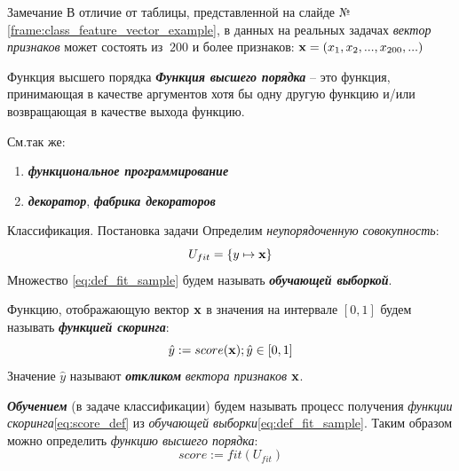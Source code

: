 \documentclass{beamer}
\newcommand{\termdef}[1]{\textbf{\textit{#1}}}
\newcommand{\term}{\textit}
\begin{document}
  \begin{frame}
   \begin{block}{Замечание}
	  В отличие от таблицы, представленной на слайде №\ref{frame:class_feature_vector_example},
	  в данных на реальных задачах \term{вектор признаков} может состоять из $~200$ и более признаков:
	  $\bold x = (x_1, x_2, ..., x_{200}, ...)$
  \end{block}
  \end{frame}
  
  \begin{frame}{Функция высшего порядка}
  \termdef{Функция высшего порядка} -- это функция, принимающая в качестве аргументов хотя бы одну другую функцию и/или возвращающая в качестве выхода функцию.
  
  См.так же:
  \begin{enumerate}
  	\item \termdef{функциональное программирование}
  	\item \termdef{декоратор}, \termdef{фабрика декораторов}
  \end{enumerate}
  
  \end{frame}
  
  \begin{frame}{Классификация. Постановка задачи}\label{frame:classification_def}
  	Определим \term{неупорядоченную совокупность}:
  	\begin{equation}\label{eq:def_fit_sample}
  	U_{fit} = \left\{ y \mapsto \bold x  \right\}
  	\end{equation}
  	Множество \eqref{eq:def_fit_sample} будем называть \termdef{обучающей выборкой}.
  	
  	Функцию, отображающую вектор $\bold x$ в значения на интервале $[0, 1]$ будем 
  	называть \termdef{функцией скоринга}:
  	\begin{equation}\label{eq:score_def}
  	\hat{y} := score( \bold x); \hat{y} \in [0, 1]
  	\end{equation}
  	Значение $\hat{y}$ называют \termdef{откликом} \term{вектора признаков} $\bold x$.
  	
  	\termdef{Обучением} (в задаче классификации) будем называть процесс получения 
  	\term{функции скоринга}\eqref{eq:score_def} 
  	из 
  	\term{обучающей выборки}\eqref{eq:def_fit_sample}.
  	Таким образом можно определить \term{функцию высшего порядка}:
  	\begin{equation}\label{eq:fit_def}
  	score := fit (U_{fit}) 
  	\end{equation}
  \end{frame}
\end{document}
